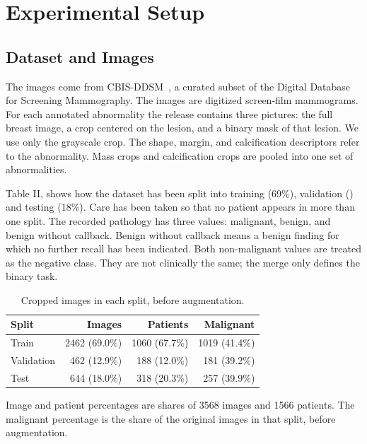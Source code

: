 \section{Experimental Setup}
\label{sec:experiments}

\subsection{Dataset and Images}
\label{sec:dataset}

The images come from CBIS-DDSM~\cite{lee2017cbis}, a curated subset of the Digital Database for Screening Mammography. The images are digitized screen-film mammograms. For each annotated abnormality the release contains three pictures: the full breast image, a crop centered on the lesion, and a binary mask of that lesion. We use only the grayscale crop. The shape, margin, and calcification descriptors refer to the abnormality. Mass crops and calcification crops are pooled into one set of abnormalities.

Table II, shows how the dataset has been split into training (69\%), validation () and testing (18\%). Care has been taken so that no patient appears in more than one split.  The recorded pathology has three values: malignant, benign, and benign without callback. Benign without callback means a benign finding for which no further recall has been indicated. Both non-malignant values are treated as the negative class. They are not clinically the same; the merge only defines the binary task. 



\begin{table}[!t]
\caption{Cropped images in each split, before augmentation.}
\label{tab:dataset}
\centering
\footnotesize
\setlength{\tabcolsep}{3.5pt}
\begin{tabular}{@{}lrrr@{}}
\toprule
Split & Images & Patients & Malignant \\
\midrule
Train & 2462 (69.0\%) & 1060 (67.7\%) & 1019 (41.4\%) \\
Validation & 462 (12.9\%) & 188 (12.0\%) & 181 (39.2\%) \\
Test & 644 (18.0\%) & 318 (20.3\%) & 257 (39.9\%) \\
\bottomrule
\end{tabular}

\vspace{0.4em}
\begin{minipage}{\columnwidth}
\footnotesize
Image and patient percentages are shares of 3568 images and 1566 patients. The malignant percentage is the share of the original images in that split, before augmentation.
\end{minipage}
\end{table}

